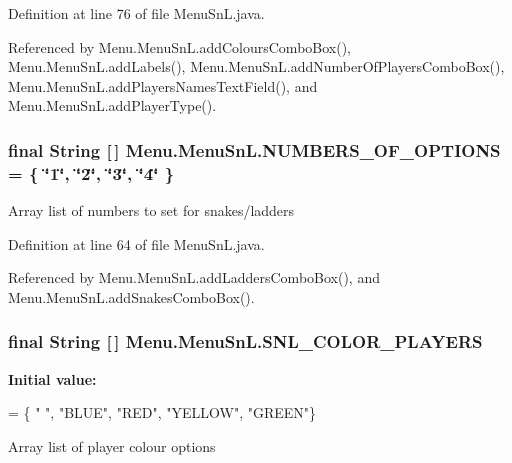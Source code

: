 Definition at line 76 of file Menu\+Sn\+L.\+java.



Referenced by Menu.\+Menu\+Sn\+L.\+add\+Colours\+Combo\+Box(), Menu.\+Menu\+Sn\+L.\+add\+Labels(), Menu.\+Menu\+Sn\+L.\+add\+Number\+Of\+Players\+Combo\+Box(), Menu.\+Menu\+Sn\+L.\+add\+Players\+Names\+Text\+Field(), and Menu.\+Menu\+Sn\+L.\+add\+Player\+Type().

\hypertarget{class_menu_1_1_menu_sn_l_aa0ead71ad043fc5f187fde721b34c34b}{}
\subsubsection[{N\+U\+M\+B\+E\+R\+S\+\_\+\+O\+F\+\_\+\+O\+P\+T\+I\+O\+N\+S}]{\setlength{\rightskip}{0pt plus 5cm}final String \mbox{[}$\,$\mbox{]} Menu.\+Menu\+Sn\+L.\+N\+U\+M\+B\+E\+R\+S\+\_\+\+O\+F\+\_\+\+O\+P\+T\+I\+O\+N\+S = \{ \char`\"{}1\char`\"{}, \char`\"{}2\char`\"{}, \char`\"{}3\char`\"{}, \char`\"{}4\char`\"{} \}\hspace{0.3cm}{\ttfamily [private]}}\label{class_menu_1_1_menu_sn_l_aa0ead71ad043fc5f187fde721b34c34b}
Array list of numbers to set for snakes/ladders 

Definition at line 64 of file Menu\+Sn\+L.\+java.



Referenced by Menu.\+Menu\+Sn\+L.\+add\+Ladders\+Combo\+Box(), and Menu.\+Menu\+Sn\+L.\+add\+Snakes\+Combo\+Box().

\hypertarget{class_menu_1_1_menu_sn_l_aa0aa3bcb48114b48faa0a49fa0c98504}{}
\subsubsection[{S\+N\+L\+\_\+\+C\+O\+L\+O\+R\+\_\+\+P\+L\+A\+Y\+E\+R\+S}]{\setlength{\rightskip}{0pt plus 5cm}final String \mbox{[}$\,$\mbox{]} Menu.\+Menu\+Sn\+L.\+S\+N\+L\+\_\+\+C\+O\+L\+O\+R\+\_\+\+P\+L\+A\+Y\+E\+R\+S\hspace{0.3cm}{\ttfamily [private]}}\label{class_menu_1_1_menu_sn_l_aa0aa3bcb48114b48faa0a49fa0c98504}
{\bfseries Initial value\+:}
\begin{DoxyCode}
= \{ \textcolor{stringliteral}{" "}, \textcolor{stringliteral}{"BLUE"}, \textcolor{stringliteral}{"RED"},
            \textcolor{stringliteral}{"YELLOW"}, \textcolor{stringliteral}{"GREEN"}\}
\end{DoxyCode}
Array list of player colour options 

